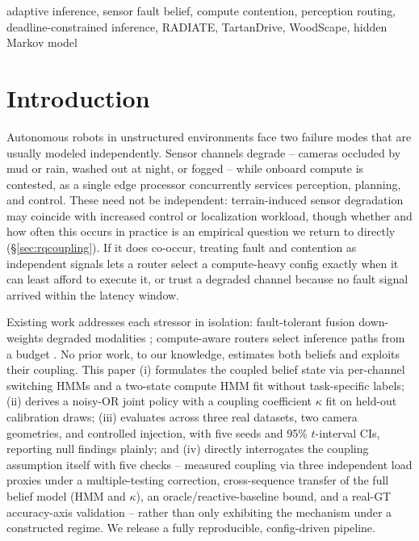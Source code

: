 \documentclass[conference]{IEEEtran}
\begin{document}
\begin{IEEEkeywords}
adaptive inference, sensor fault belief, compute contention,
perception routing, deadline-constrained inference, RADIATE,
TartanDrive, WoodScape, hidden Markov model
\end{IEEEkeywords}

\section{Introduction}
\label{sec:intro}

Autonomous robots in unstructured environments face two failure
modes that are usually modeled independently. Sensor channels
degrade -- cameras occluded by mud or rain, washed out at night, or
fogged -- while onboard compute is contested, as a single edge
processor concurrently services perception, planning, and control.
These need not be independent: terrain-induced sensor degradation
may coincide with increased control or localization workload, though
whether and how often this occurs in practice is an empirical
question we return to directly (\S\ref{sec:rqcoupling}). If it does
co-occur, treating fault and contention as independent signals lets
a router select a compute-heavy config exactly when it can least
afford to execute it, or trust a degraded channel because no fault
signal arrived within the latency window.

Existing work addresses each stressor in isolation: fault-tolerant
fusion down-weights degraded modalities
\cite{antonante2022monitoring,tian2025fault}; compute-aware routers
select inference paths from a budget
\cite{laskaridis2021adaptive,teerapittayanon2016branchynet}. No prior
work, to our knowledge, estimates both beliefs and exploits their
coupling. This paper (i) formulates the coupled belief state via
per-channel switching HMMs and a two-state compute HMM fit without
task-specific labels; (ii) derives a noisy-OR joint policy with a
coupling coefficient $\kappa$ fit on held-out calibration draws;
(iii) evaluates across three real datasets, two camera geometries,
and controlled injection, with five seeds and 95\% $t$-interval CIs,
reporting null findings plainly; and (iv) directly interrogates the
coupling assumption itself with five checks -- measured coupling via
three independent load proxies under a multiple-testing correction,
cross-sequence transfer of the full belief model (HMM and $\kappa$), an
oracle/reactive-baseline bound, and a real-GT accuracy-axis
validation -- rather than only exhibiting the mechanism under a
constructed regime. We release a fully reproducible, config-driven
pipeline.\footnotemark[1]
\end{document}
